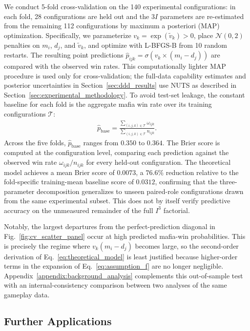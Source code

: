 \documentclass[sigconf,anonymous,balance=false]{aamas}
\begin{document}
We conduct 5-fold cross-validation on the 140 experimental configurations: in each fold, 28 configurations are held out and the $3I$ parameters are re-estimated from the remaining 112 configurations by maximum a posteriori (MAP) optimization. Specifically, we parameterize $v_k=\exp(\widetilde{v}_k)>0$, place $\mathcal{N}(0,2)$ penalties on $m_i$, $d_j$, and $\widetilde{v}_k$, and optimize with L-BFGS-B from 10 random restarts. The resulting point predictions $\hat{p}_{ijk}=\sigma(v_k\times(m_i-d_j))$ are compared with the observed win rates. This computationally lighter MAP procedure is used only for cross-validation; the full-data capability estimates and posterior uncertainties in Section~\ref{sec:ddd_results} use NUTS as described in Section~\ref{sec:experimental_methodology}. To avoid test-set leakage, the constant baseline for each fold is the aggregate mafia win rate over its training configurations $\mathcal{T}$:
\begin{align}
    \hat{p}_{\mathrm{base}}
    = \frac{\sum_{(i,j,k)\in\mathcal{T}}\omega_{ijk}}
           {\sum_{(i,j,k)\in\mathcal{T}}n_{ijk}}.
    \label{eq:cv_baseline}
\end{align}
Across the five folds, $\hat{p}_{\mathrm{base}}$ ranges from $0.350$ to $0.364$. The Brier score is computed at the configuration level, comparing each prediction against the observed win rate $\omega_{ijk}/n_{ijk}$ for every held-out configuration. The theoretical model achieves a mean Brier score of $0.0073$, a $76.6\%$ reduction relative to the fold-specific training-mean baseline score of $0.0312$, confirming that the three-parameter decomposition generalizes to unseen paired-role configurations drawn from the same experimental subset. This does not by itself verify predictive accuracy on the unmeasured remainder of the full $I^3$ factorial.

Notably, the largest departures from the perfect-prediction diagonal in Fig.~\ref{fig:cv_scatter_panel} occur at high predicted mafia-win probabilities. This is precisely the regime where $v_k(m_i-d_j)$ becomes large, so the second-order derivation of Eq.~\eqref{eq:theoretical_model} is least justified because higher-order terms in the expansion of Eq.~\eqref{eq:assumption_f} are no longer negligible. Appendix~\ref{appendix:background_analysis} complements this out-of-sample test with an internal-consistency comparison between two analyses of the same gameplay data.

\subsection{Further Applications}
\label{sec:serendipitous_results}
\end{document}
